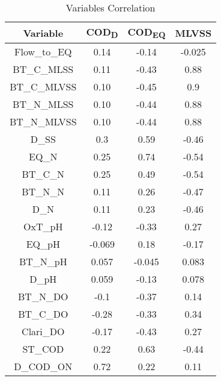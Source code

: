 \begin{table}[!ht]
    \centering
    \begin{tabular}{cccc}
    \hline
        Variable & COD\textsubscript{D} & COD\textsubscript{EQ} & MLVSS  \\ \hline
        Flow\_to\_EQ & 0.14 & -0.14 & -0.025  \\ 
        BT\_C\_MLSS & 0.11 & -0.43 & 0.88  \\ 
        BT\_C\_MLVSS & 0.10 & -0.45 & 0.9  \\ 
        BT\_N\_MLSS & 0.10 & -0.44 & 0.88  \\ 
        BT\_N\_MLVSS & 0.10 & -0.44 & 0.88  \\ 
        D\_SS & 0.3 & 0.59 & -0.46  \\ 
        EQ\_N & 0.25 & 0.74 & -0.54  \\ 
        BT\_C\_N & 0.25 & 0.49 & -0.54  \\ 
        BT\_N\_N & 0.11 & 0.26 & -0.47  \\ 
        D\_N & 0.11 & 0.23 & -0.46  \\ 
        OxT\_pH & -0.12 & -0.33 & 0.27  \\ 
        EQ\_pH & -0.069 & 0.18 & -0.17  \\ 
        BT\_N\_pH & 0.057 & -0.045 & 0.083  \\ 
        D\_pH & 0.059 & -0.13 & 0.078  \\ 
        BT\_N\_DO & -0.1 & -0.37 & 0.14  \\ 
        BT\_C\_DO & -0.28 & -0.33 & 0.34  \\ 
        Clari\_DO & -0.17 & -0.43 & 0.27  \\ 
        ST\_COD & 0.22 & 0.63 & -0.44  \\ 
        D\_COD\_ON & 0.72 & 0.22 & 0.11  \\ \hline
    \end{tabular}
    \caption{Variables Correlation}
    \label{correlation}
\end{table}